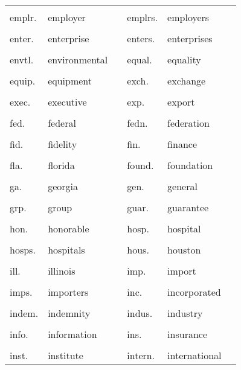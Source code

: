 \documentclass[10pt, letterpaper]{article}
\begin{document}
\begin{spacing}{1.0}
\begin{footnotesize}
\begin{longtable}[H]{p{1in}>{\raggedright}p{2in} p{0.2in} p{1in}>{\raggedright}p{2in} p{0in}}
    &  &  &  &  & \\[-6pt]
    emplr. & employer & & emplrs. & employers &\\
    &  &  &  &  & \\[-6pt]
    enter. & enterprise & & enters. & enterprises &\\
    &  &  &  &  & \\[-6pt]
    envtl. & environmental & & equal. & equality &\\
    &  &  &  &  & \\[-6pt]
    equip. & equipment & & exch. & exchange &\\
    &  &  &  &  & \\[-6pt]
    exec. & executive & & exp. & export &\\
    &  &  &  &  & \\[-6pt]
    fed. & federal & & fedn. & federation &\\
    &  &  &  &  & \\[-6pt]
    fid. & fidelity & & fin. & finance &\\
    &  &  &  &  & \\[-6pt]
    fla. & florida & & found. & foundation &\\
    &  &  &  &  & \\[-6pt]
    ga. & georgia & & gen. & general &\\
    &  &  &  &  & \\[-6pt]
    grp. & group & & guar. & guarantee &\\
    &  &  &  &  & \\[-6pt]
    hon. & honorable & & hosp. & hospital &\\
    &  &  &  &  & \\[-6pt]
    hosps. & hospitals & & hous. & houston &\\
    &  &  &  &  & \\[-6pt]
    ill. & illinois & & imp. & import &\\
    &  &  &  &  & \\[-6pt]
    imps. & importers & & inc. & incorporated &\\
    &  &  &  &  & \\[-6pt]
    indem. & indemnity & & indus. & industry &\\
    &  &  &  &  & \\[-6pt]
    info. & information & & ins. & insurance &\\
    &  &  &  &  & \\[-6pt]
    inst. & institute & & intern. & international &\\

\end{longtable}
\end{footnotesize}
\end{spacing}
\end{document}
